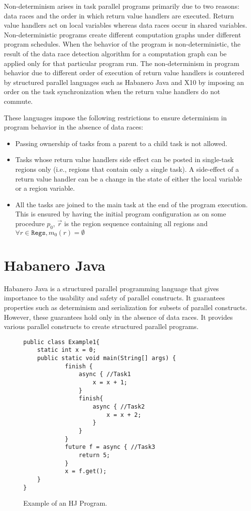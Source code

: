 Non-determinism arises in task parallel programs primarily due to two reasons: data races and the order in which return value handlers are executed. Return value handlers act on local variables whereas data races occur in shared variables. Non-deterministic programs create different computation graphs under different program schedules. When the behavior of the program is non-deterministic, the result of the data race detection algorithm for a computation graph can be applied only for that particular program run. The non-determinism in program behavior due to different order of execution of return value handlers is countered by structured parallel languages such as Habanero Java and X10 by imposing an order on the task synchronization when the return value handlers do not commute. 

These languages impose the following restrictions to ensure determinism in program behavior in the absence of data races:
\begin{itemize}
\item Passing ownership of tasks from a parent to a child task is not allowed.
\item Tasks whose return value handlers side effect can be posted in single-task regions only (i.e., regions that contain only a single task). A side-effect of a return value handler can be a change in the state of either the local variable or a region variable.
\item All the tasks are joined to the main task at the end of the program execution. This is ensured by having the initial program configuration as  on some procedure $p_0$, $\vec{r}$ is the region sequence containing all regions and $\forall r \in \mathtt{Regs}, m_0(r) = \emptyset$
\end{itemize}

\section{Habanero Java}
Habanero Java is a structured parallel programming language that gives importance to the usability and safety of parallel constructs. It guarantees properties such as determinism and serialization for subsets of parallel constructs. However, these guarantees hold only in the absence of data races. It provides various parallel constructs to create structured parallel programs. 

\begin{figure}
  \begin{center}
    \begin{lstlisting}
public class Example1{
	static int x = 0;
	public static void main(String[] args) {
			finish {
				async { //Task1
					x = x + 1;
				}
				finish{
					async { //Task2
						x = x + 2;
					}	
				}
			}
			future f = async { //Task3
				return 5;
			}
			x = f.get();
	}
}
\end{lstlisting}
  \end{center}
  \caption{Example of an HJ Program.}
  \label{fig:hj-async-fin}
\end{figure}

